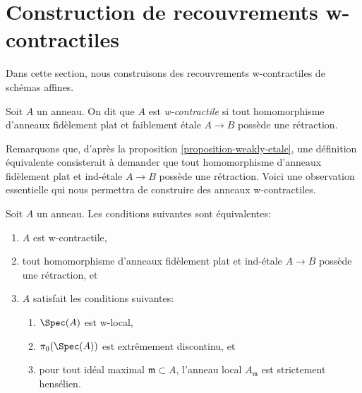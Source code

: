 \section{Construction de recouvrements w-contractiles}
\label{section-w-contractible}

\noindent
Dans cette section, nous construisons des recouvrements w-contractiles de schémas affines.

\begin{definition}
\label{definition-w-contractible}
Soit $A$ un anneau. On dit que $A$ est {\it w-contractile} si tout
homomorphisme d'anneaux fidèlement plat et faiblement \'etale $A \to B$ possède une rétraction.
\end{definition}

\noindent
Remarquons que, d'après la proposition \ref{proposition-weakly-etale},
une définition équivalente consisterait à demander que tout homomorphisme d'anneaux
fidèlement plat et ind-\'etale $A \to B$ possède une rétraction.
Voici une observation essentielle qui nous permettra de construire
des anneaux w-contractiles.

\begin{lemma}
\label{lemma-w-local-strictly-henselian-extremally-disconnected}
Soit $A$ un anneau. Les conditions suivantes sont équivalentes:
\begin{enumerate}
\item $A$ est w-contractile,
\item tout homomorphisme d'anneaux fidèlement plat et ind-\'etale $A \to B$ possède
une rétraction, et
\item $A$ satisfait les conditions suivantes:
\begin{enumerate}
\item $\Spec(A)$ est w-local,
\item $\pi_0(\Spec(A))$ est extrêmement discontinu, et
\item pour tout idéal maximal $\mathfrak m \subset A$, l'anneau
local $A_\mathfrak m$ est strictement hensélien.
\end{enumerate}
\end{enumerate}
\end{lemma}

